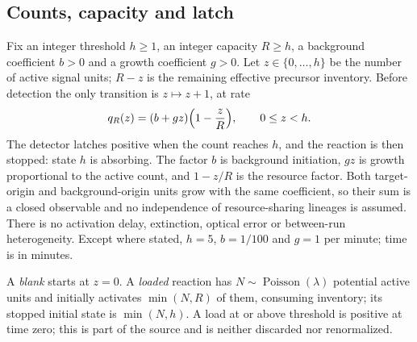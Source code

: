 \documentclass[11pt,a4paper]{article}
\theoremstyle{plain}
\theoremstyle{definition}
\theoremstyle{remark}
\DeclareMathOperator{\Poi}{Poisson}
\begin{document}
\subsection{Counts, capacity and latch}\label{sec:source}
Fix an integer threshold $h\ge1$, an integer capacity $R\ge h$, a background coefficient $b>0$ and a growth coefficient $g>0$. Let $z\in\{0,\dots,h\}$ be the number of active signal units; $R-z$ is the remaining effective precursor inventory. Before detection the only transition is $z\mapsto z+1$, at rate
\begin{equation}\label{eq:rates}
q_R(z)=(b+gz)\Bigl(1-\frac zR\Bigr),\qquad 0\le z<h.
\end{equation}
The detector latches positive when the count reaches $h$, and the reaction is then stopped: state $h$ is absorbing. The factor $b$ is background initiation, $gz$ is growth proportional to the active count, and $1-z/R$ is the resource factor. Both target-origin and background-origin units grow with the same coefficient, so their sum is a closed observable and no independence of resource-sharing lineages is assumed. There is no activation delay, extinction, optical error or between-run heterogeneity. Except where stated, $h=5$, $b=1/100$ and $g=1$ per minute; time is in minutes.

A \emph{blank} starts at $z=0$. A \emph{loaded} reaction has $N\sim\Poi(\lambda)$ potential active units and initially activates $\min(N,R)$ of them, consuming inventory; its stopped initial state is $\min(N,h)$. A load at or above threshold is positive at time zero; this is part of the source and is neither discarded nor renormalized.
\end{document}
